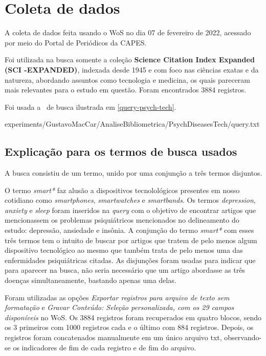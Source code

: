 \section{Coleta de dados}

A coleta de dados feita usando o WoS no dia 07 de fevereiro de 2022, acessado por meio do Portal de Periódicos da CAPES.

Foi utilizada na busca somente a coleção \textbf{Science  Citation  Index  Expanded (SCI -EXPANDED)}, indexada desde 1945 e com foco nas ciências exatas e da natureza, abordando assuntos como tecnologia e medicina, 
os quais pareceram mais relevantes para o estudo em questão. Foram encontrados 3884 registros.

Foi usada a \query\  de busca ilustrada em \ref{query-psych-tech}.


{experiments/GustavoMacCar/AnaliseBibliometrica/PsychDiseasesTech/query.txt}

\subsection{Explicação para os termos de busca usados}

A busca consistiu de um termo, unido por uma conjunção a três termos disjuntos.

O termo \textit{smart*} faz alusão a dispositivos tecnolológicos presentes em nosso cotidiano como \textit{smartphones}, \textit{smartwatches} e \textit{smartbands}. Os termos \textit{depression}, \textit{anxiety} e \textit{sleep} foram 
inseridos na \textit{query} com o objetivo de encontrar artigos que mencionassem os problemas psiquiátricos mencionados no delineamento do estudo: depressão, ansiedade e insônia. A conjunção do termo \textit{smart*} com esses três termos tem o 
intuito de buscar por artigos que tratem de pelo menos algum dispositivo tecnológico ao mesmo que também trata de pelo menos uma das enfermidades psiquiátricas citadas. As disjunções foram usadas para indicar que para aparecer na busca, não seria 
necessário que um artigo abordasse as três doenças simultaneamente, bastando apenas uma delas.

Foram utilizadas as opções \textit{Exportar registros para arquivo de texto sem formatação} e \textit{Gravar Conteúdo: Seleção personalizada, com os 29 campos disponíveis} no WoS. Os 3884 registros foram recuperados em quatro blocos, sendo os 3 primeiros com 1000 registros cada e o 
último com 884 registros. Depois, os registros foram concatenados manualmente em um único arquivo txt, observando-se os indicadores de fim de cada registro e de fim do arquivo. 

